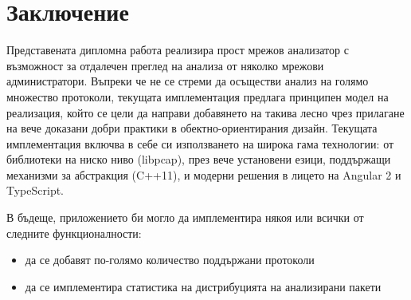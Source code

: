 \documentclass[12pt,a4paper,oneside]{book}
\begin{document}
\chapter{Заключение}

Представената дипломна работа реализира прост мрежов анализатор с възможност
за отдалечен преглед на анализа от няколко мрежови администратори.
Въпреки че не се стреми да осъществи анализ на голямо множество протоколи,
текущата имплементация предлага принципен модел на реализация, който се
цели да направи добавянето на такива лесно чрез прилагане на вече доказани
добри практики в обектно-ориентирания дизайн. Текущата имплементация включва
в себе си използването на широка гама технологии: от библиотеки на ниско ниво (libpcap),
през вече установени езици, поддържащи механизми за абстракция (C++11),
и модерни решения в лицето на Angular 2 и TypeScript.

В бъдеще, приложението би могло да имплементира някоя или всички от следните
функционалности:

\begin{itemize}
  \item
  да се добавят по-голямо количество поддържани протоколи
\item
  да се имплементира статистика на дистрибуцията на анализирани пакети
\end{itemize}




\listoffigures

\end{document}
